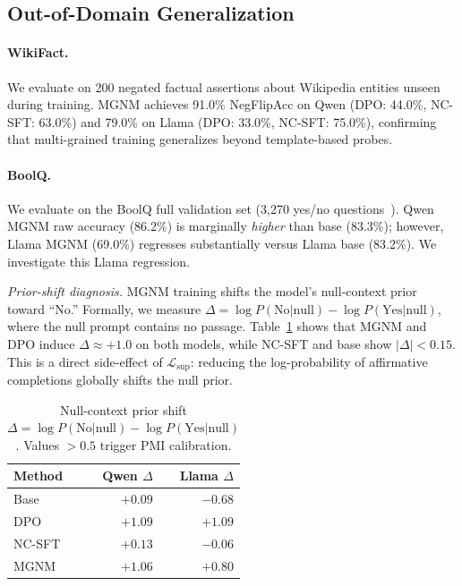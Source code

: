 \documentclass[letterpaper]{article}
\begin{document}
\subsection{Out-of-Domain Generalization}
\label{sec:ood}

\paragraph{WikiFact.}
We evaluate on 200 negated factual assertions about Wikipedia entities
unseen during training.
MGNM achieves 91.0\% NegFlipAcc on Qwen (DPO: 44.0\%, NC-SFT: 63.0\%)
and 79.0\% on Llama (DPO: 33.0\%, NC-SFT: 75.0\%),
confirming that multi-grained training generalizes beyond template-based probes.

\paragraph{BoolQ.}
We evaluate on the BoolQ full validation set (3,270 yes/no questions~\cite{clark2019boolq}).
Qwen MGNM raw accuracy (86.2\%) is marginally \emph{higher} than base (83.3\%);
however, Llama MGNM (69.0\%) regresses substantially versus Llama base (83.2\%).
We investigate this Llama regression.

\emph{Prior-shift diagnosis.}
MGNM training shifts the model's null-context prior toward ``No.''
Formally, we measure $\Delta = \log P(\text{No}|\text{null}) - \log P(\text{Yes}|\text{null})$,
where the null prompt contains no passage.
Table~\ref{tab:prior} shows that MGNM and DPO induce
$\Delta \approx +1.0$ on both models, while NC-SFT and base show $|\Delta| < 0.15$.
This is a direct side-effect of $\mathcal{L}_\text{sup}$: reducing the log-probability
of affirmative completions globally shifts the null prior.

\begin{table}[t]
\centering
\small
\caption{Null-context prior shift $\Delta = \log P(\text{No}|\text{null}) - \log P(\text{Yes}|\text{null})$.
  Values $>0.5$ trigger PMI calibration.}
\label{tab:prior}
\begin{tabular}{lrr}
\toprule
Method & Qwen $\Delta$ & Llama $\Delta$ \\
\midrule
Base & $+0.09$ & $-0.68$ \\
DPO & $+1.09$ & $+1.09$ \\
NC-SFT & $+0.13$ & $-0.06$ \\
MGNM & $+1.06$ & $+0.80$ \\
\bottomrule
\end{tabular}
\end{table}
\end{document}
